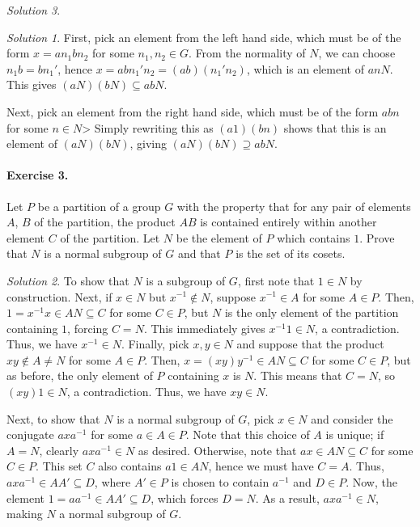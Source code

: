 \documentclass[11pt]{report}
\theoremstyle{remark}
\newtheorem*{solution}{Solution}
\begin{document}
\begin{solution}
\begin{solution}
        First, pick an element from the left hand side, which must be of the form
        $x = an_1bn_2$ for some $n_1, n_2 \in G$. From the normality of $N$, we can
        choose $n_1b = bn_1'$, hence $x = abn_1'n_2 = (ab)(n_1'n_2)$, which is an
        element of $anN$. This gives $(aN)(bN) \subseteq abN$.

        Next, pick an element from the right hand side, which must be of the form
        $abn$ for some $n \in N$> Simply rewriting this as $(a1)(bn)$ shows that this
        is an element of $(aN)(bN)$, giving $(aN)(bN) \supseteq abN$.
    \end{solution}

    \paragraph{Exercise 3.} Let $P$ be a partition of a group $G$ with the property
    that for any pair of elements $A$, $B$ of the partition, the product $AB$ is
    contained entirely within another element $C$ of the partition. Let $N$ be the
    element of $P$ which contains $1$. Prove that $N$ is a normal subgroup of $G$ and
    that $P$ is the set of its cosets.
    \begin{solution}
        To show that $N$ is a subgroup of $G$, first note that $1 \in N$ by
        construction. Next, if $x \in N$ but $x^{-1} \notin N$, suppose $x^{-1} \in
        A$ for some $A \in P$. Then, $1 = x^{-1}x \in AN \subseteq C$ for some $C
        \in P$, but $N$ is the only element of the partition containing $1$, forcing
        $C = N$. This immediately gives $x^{-1}1 \in N$, a contradiction. Thus, we
        have $x^{-1} \in N$. Finally, pick $x, y \in N$ and suppose that the product
        $xy \notin A \neq N$ for some $A \in P$. Then, $x = (xy)y^{-1} \in AN
        \subseteq C$ for some $C \in P$, but as before, the only element of $P$
        containing $x$ is $N$. This means that $C = N$, so $(xy)1 \in N$, a
        contradiction. Thus, we have $xy \in N$.

        Next, to show that $N$ is a normal subgroup of $G$, pick $x\in N$ and
        consider the conjugate $axa^{-1}$ for some $a \in A \in P$. Note that this
        choice of $A$ is unique; if $A = N$, clearly $axa^{-1} \in N$ as desired.
        Otherwise, note that $ax \in AN \subseteq C$ for some $C \in P$. This set $C$
        also contains $a 1 \in AN$, hence we must have $C = A$. Thus, $axa^{-1} \in
        A A' \subseteq D$, where $A'\in P$ is chosen to contain $a^{-1}$ and $D \in
        P$. Now, the element $1 = a a^{-1} \in A A' \subseteq D$, which forces $D =
        N$. As a result, $axa^{-1} \in N$, making $N$ a normal subgroup of $G$.


\end{solution}
\end{solution}
\end{document}
